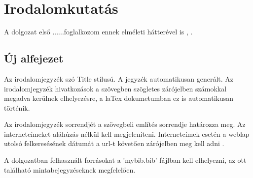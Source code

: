 \chapter{Irodalomkutatás}

\thispagestyle{fancy}
\pagestyle{fancy}

A dolgozat első ......foglalkozom ennek elméleti hátterével is  \cite{detection01}, \cite{detection02}. 

\vspace{8pt}
\section{Új alfejezet}
Az irodalomjegyzék szó Title stílusú. A jegyzék automatikusan generált. Az irodalomjegyzék hivatkozások a szövegben szögletes zárójelben számokkal megadva kerülnek elhelyezésre, a laTex dokumetumban ez is automatikusan történik.\par
Az irodalomjegyzék sorrendjét a szövegbeli említés sorrendje határozza meg.
Az internetcímeket aláhúzás nélkül kell megjeleníteni. Internetcímek esetén a weblap utolsó felkeresésének dátumát a url-t követően zárójelben meg kell adni \cite{detection16}.\par
A dolgozatban felhasznált forrásokat a 'mybib.bib' fájlban kell elhelyezni, az ott található mintabejegyzéseknek megfelelően.


